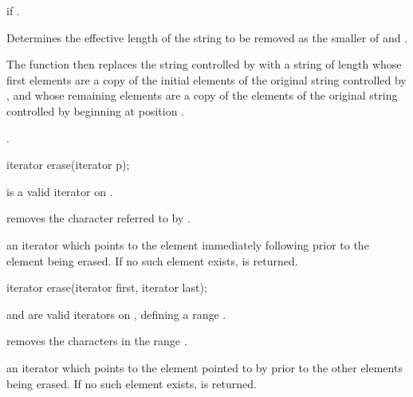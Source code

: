 \begin{itemdescr}
\pnum
\requires
{}

\pnum
\throws
{}
if 
.

\pnum
\effects
Determines the effective length 
of the string to be removed as the smaller of  and
.

The function then replaces the string controlled by
with a string of length
whose first  elements are a copy of the initial elements of the original string controlled by
,
and whose remaining elements are a copy of the elements of the original string controlled by
beginning at position
.

\pnum
\returns
{}.
\end{itemdescr}

%
%
\begin{itemdecl}
iterator erase(iterator p);
\end{itemdecl}

\begin{itemdescr}
\pnum
\requires
{} is a valid iterator on .

\pnum
\effects
removes the character referred to by .

\pnum
\returns
an iterator which points to the element immediately following  prior to
the element being erased.
If no such element exists,
is returned.
\end{itemdescr}

%
%
\begin{itemdecl}
iterator erase(iterator first, iterator last);
\end{itemdecl}

\begin{itemdescr}
\pnum
\requires
{} and  are valid iterators on
,
defining a range
\tcode{[first,last)}.

\pnum
\effects
removes the characters in the range
\tcode{[first,last)}.

\pnum
\returns
an iterator which points to the element pointed to by  prior to
the other elements being erased.
If no such element exists,
is returned.
\end{itemdescr}

